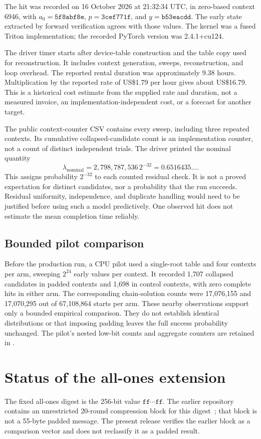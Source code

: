 \documentclass[11pt,a4paper]{article}
\newcommand{\hex}[1]{\texttt{#1}}
\begin{document}
The hit was recorded on 16 October 2026 at 21:32:34 UTC, in zero-based context 6946, with $a_0=\hex{5f8abf8e}$, $p=\hex{3cef771f}$, and $y=\hex{b53eacdd}$. The early state extracted by forward verification agrees with those values. The kernel was a fused Triton implementation; the recorded PyTorch version was 2.4.1+cu124.

The driver timer starts after device-table construction and the table copy used for reconstruction. It includes context generation, sweeps, reconstruction, and loop overhead. The reported rental duration was approximately 9.38 hours. Multiplication by the reported rate of US\$1.79 per hour gives about US\$16.79. This is a historical cost estimate from the supplied rate and duration, not a measured invoice, an implementation-independent cost, or a forecast for another target.

The public context-counter CSV contains every sweep, including three repeated contexts. Its cumulative collapsed-candidate count is an implementation counter, not a count of distinct independent trials. The driver printed the nominal quantity
\[
\lambda_{\mathrm{nominal}}=2{,}798{,}787{,}536\,2^{-32}
                         =0.6516435\ldots.
\]
This assigns probability $2^{-32}$ to each counted residual check. It is not a proved expectation for distinct candidates, nor a probability that the run succeeds. Residual uniformity, independence, and duplicate handling would need to be justified before using such a model predictively. One observed hit does not estimate the mean completion time reliably.

\subsection{Bounded pilot comparison}
Before the production run, a CPU pilot used a single-root table and four contexts per arm, sweeping $2^{24}$ early values per context. It recorded 1,707 collapsed candidates in padded contexts and 1,698 in control contexts, with zero complete hits in either arm. The corresponding chain-solution counts were 17,076,155 and 17,070,295 out of 67,108,864 starts per arm. These nearby observations support only a bounded empirical comparison. They do not establish identical distributions or that imposing padding leaves the full success probability unchanged. The pilot's nested low-bit counts and aggregate counters are retained in .

\section{Status of the all-ones extension}
\label{sec:allones}
The fixed all-ones digest is the 256-bit value $\hex{ff}\cdots\hex{ff}$. The earlier repository contains an unrestricted 20-round compression block for this digest~\cite{basra}; that block is not a 55-byte padded message. The present release verifies the earlier block as a comparison vector and does not reclassify it as a padded result.
\end{document}
